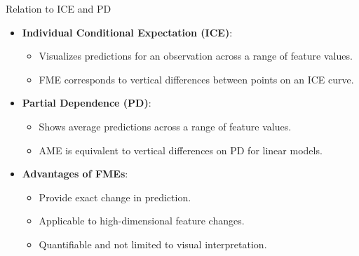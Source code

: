 \documentclass[11pt,compress,t,notes=noshow, aspectratio=169, xcolor=table]{beamer}
\begin{document}



\begin{frame}{Relation to ICE and PD}
\begin{itemize}
\item \textbf{Individual Conditional Expectation (ICE)}:
\begin{itemize}
\item Visualizes predictions for an observation across a range of feature values.
\item FME corresponds to vertical differences between points on an ICE curve.
\end{itemize}
\item \textbf{Partial Dependence (PD)}:
\begin{itemize}
\item Shows average predictions across a range of feature values.
\item AME is equivalent to vertical differences on PD for linear models.
\end{itemize}
\item \textbf{Advantages of FMEs}:
\begin{itemize}
\item Provide exact change in prediction.
\item Applicable to high-dimensional feature changes.
\item Quantifiable and not limited to visual interpretation.
\end{itemize}
\end{itemize}
\end{frame}
\end{document}
